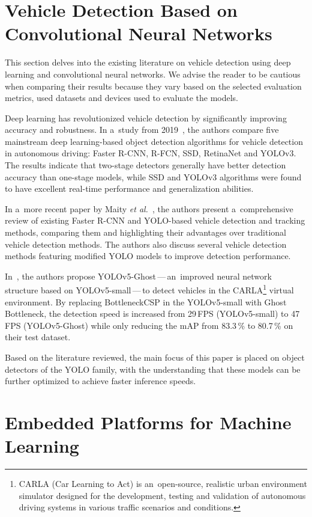 \section{Vehicle Detection Based on Convolutional Neural Networks}

This section delves into the existing literature on vehicle detection using deep
learning and convolutional neural networks. We advise the reader to be cautious
when comparing their results because they vary based on the selected evaluation
metrics, used datasets and devices used to evaluate the models.

Deep learning has revolutionized vehicle detection by significantly improving
accuracy and robustness. In a~study from 2019~\cite{Wang2019}, the authors
compare five mainstream deep learning-based object detection algorithms for
vehicle detection in autonomous driving: Faster R-CNN, R-FCN, SSD, RetinaNet
and YOLOv3. The results indicate that two-stage detectors generally have better
detection accuracy than one-stage models, while SSD and YOLOv3 algorithms were
found to have excellent real-time performance and generalization abilities. 

In a~more recent paper by Maity \textit{et al.}~\cite{Maity2021},
the authors present a~comprehensive review of existing Faster R-CNN and
YOLO-based vehicle detection and tracking methods, comparing them and
highlighting their advantages over traditional vehicle detection methods. The
authors also discuss several vehicle detection methods featuring modified YOLO
models to improve detection performance.

In~\cite{Wu2021}, the authors propose YOLOv5-Ghost\,---\,an~improved neural
network structure based on YOLOv5-small\,---\,to detect vehicles in the
CARLA\footnote{CARLA (Car Learning to Act) is an~open-source, realistic urban
environment simulator designed for the development, testing and validation of
autonomous driving systems in various traffic scenarios and conditions.} virtual
environment. By replacing BottleneckCSP in the YOLOv5-small with Ghost
Bottleneck, the detection speed is increased from 29\,FPS (YOLOv5-small) to 47\,FPS
(YOLOv5-Ghost) while only reducing the mAP from \num{83.3}\,\% to \num{80.7}\,\%
on their test dataset.

Based on the literature reviewed, the main focus of this paper is placed on
object detectors of the YOLO family, with the understanding that these models
can be further optimized to achieve faster inference speeds.


\section{Embedded Platforms for Machine Learning}
\label{EmbeddedPlatforms}

